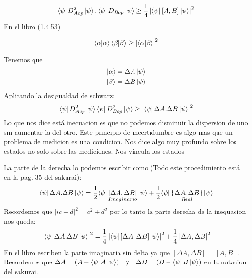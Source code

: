 \documentclass{article}
\newcommand{\caja}[3]{%
  \begin{tcolorbox}[colback=#1!5!white,colframe=#1!25!black,title=#2]
    #3
  \end{tcolorbox}%
}
\begin{document}
\caja{black}{Principio de incertidumbre }{
  \begin{gather}
    \bra{\psi}D _{Aop } ^ {2 }\ket{\psi} . \bra{\psi}D _{Bop } \ket{\psi} \geq \frac{1}{4 }\left|\bra{\psi}[A,B ]\ket{\psi} \right|^ {2 }   
    \label{eq:tesis }
  \end{gather}
  En el libro (1.4.53)
}
\caja{green}{Inecuacion de schwarz}{
  \begin{gather}
    \bra{\alpha}\ket{\alpha}\bra{\beta}\ket{\beta} \geq \left|\bra{\alpha}\ket{\beta} \right| ^ {2 }
    \label{eq:schwarz_inequality}
  \end{gather}
}
Tenemos que 
\begin{gather}
  \ket{\alpha} = \Delta A \ket{\psi}\\
  \ket{\beta} = \Delta B \ket{\psi}
\end{gather}
Aplicando la desigualdad de schwarz: 
\begin{gather}
  \bra{\psi}D _{Aop } ^ {2 }\ket{\psi}\bra{\psi}D _{Bop } ^ {2 }\ket{\psi} \geq \left|\bra{\psi}\Delta A . \Delta B \ket{\psi} \right|^ {2} 
\end{gather}
Lo que nos dice está inecuacion es que no podemos disminuir la dispersion de uno sin aumentar la del otro. 
Este principio de incertidumbre es algo mas que un problema de medicion es una condicion. Nos dice algo muy profundo sobre los estados no solo sobre las mediciones. Nos vincula los estados.

La parte de la derecha lo podemos escribir como (Todo este procedimiento está en la pag. 35 del sakurai): 
\begin{gather}
  \bra{\psi}\Delta A . \Delta B \ket{\psi} = \frac{1}{2}\underset{Imaginario }{\bra{\psi}[\Delta A , \Delta B ]\ket{\psi}} + \frac{1}{2} \underset{Real }{\bra{\psi}\{\Delta A, \Delta B \}\ket{\psi}}    
\end{gather}
Recordemos que $ \left|ic + d \right|^2 = c ^2 + d ^2 $ por lo tanto la parte derecha de la inequacion nos queda: 
\begin{gather}
  \left|\bra{\psi}\Delta A . \Delta B \ket{\psi} \right|^ {2 } = \frac{1}{4} \left|\bra{\psi}[\Delta A,\Delta B ]\ket{\psi} \right|^ {2 } + \frac{1}{4} \left|{\Delta A, \Delta B }\right|^ {2 } 
\end{gather}
En el libro escriben la parte imaginaria sin delta ya que $ [\Delta A, \Delta B] = [A,B] $. Recordemos que $ \Delta A = (A- \bra{\psi}A \ket{\psi} ) \quad \text{y}\quad \Delta B = (B- \bra{\psi}B \ket{\psi} ) $ en la notacion del sakurai.
\end{document}
